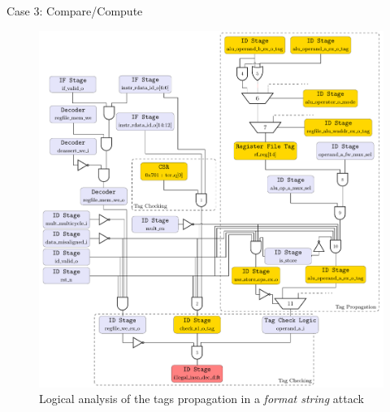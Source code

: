 \begin{frame}[noframenumbering]{Case 3: Compare/Compute}
    \begin{figure}
        \centering
        \includegraphics[height=.8\textheight]{src/2_vuln_assessment/img/comp_compu/arborescence_propagation.pdf}
        \caption{Logical analysis of the tags propagation in a \textit{format string} attack}
        \label{fig:analyseLogiqueCompCompute}
    \end{figure}
\end{frame}


